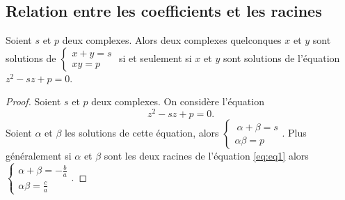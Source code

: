 \subsection{Relation entre les coefficients et les racines}
\label{subsec:relationcoefsracines}
%
\begin{prop}
  Soient \(s\) et \(p\) deux complexes. Alors deux complexes quelconques \(x\) et \(y\) sont solutions de \(\begin{cases} x +y = s \\ xy=p \end{cases}\) si et seulement si \(x\) et \(y\) sont solutions de l'équation \(z^2 -sz+p=0\).
\end{prop}
\begin{proof}
  Soient \(s\) et \(p\) deux complexes. On considère l'équation
  \begin{equation}
    z^2-sz+p=0.
  \end{equation}
  Soient \(\alpha\) et \(\beta\) les solutions de cette équation, alors
  $\begin{cases} \
    \alpha +\beta = s \\
    \alpha \beta=p
  \end{cases}$.
  Plus généralement si \(\alpha\) et \(\beta\) sont les deux racines de l'équation \eqref{eq:eq1} alors \(\begin{cases} \alpha + \beta = -\frac{b}{a} \\ \alpha \beta = \frac{c}{a} \end{cases}\).
\end{proof}
%
